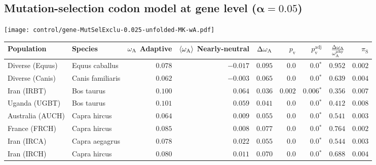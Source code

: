 \subsection{Mutation-selection codon model at gene level ($\bm{\alpha=0.05}$)}
\begin{center}
    \texttt{[image: control/gene-MutSelExclu-0.025-unfolded-MK-wA.pdf]}
    \begin{adjustbox}{width = 1\textwidth}
        \begin{tabular}{|l|l|r|r|r|r|r|r|r|}
            \toprule
            Population & Species & \specialcell{$\omega_{\mathrm{A}}$ \\ Adaptive}                & \specialcell{$\left< \omega_{\mathrm{A}} \right>$ \\ Nearly-neutral}                & $\Delta \omega_{\mathrm{A}} $    & $p_{\mathrm{v}}$ & $p_{\mathrm{v}}^{\mathrm{adj}}$  & $\frac{\Delta\omega_{\mathrm{A}}}{\omega_{\mathrm{A}}^{\mathrm{phy}}}$ & $\pi_{\textrm{S}}$    \\
            \midrule
            Diverse (Equus)                    & Equus caballus          & $ 0.078$ & $-0.017$  & $ 0.095$ & $0.0$ & $\bm{0.0{^*}}$ & $ 0.952$ & $ 0.002$ \\
            Diverse (Canis)                  & Canis familiaris          & $ 0.062$ & $-0.003$  & $ 0.065$ & $0.0$    & $\bm{0.0{^*}}$    & $ 0.639$ & $ 0.004$ \\
            Iran (IRBT)               & Bos taurus        & $ 0.100$ & $ 0.064$  & $ 0.036$ & $ 0.002$    & $\bm{ 0.006{^*}}$    & $ 0.356$ & $ 0.007$ \\
            Uganda (UGBT)                  & Bos taurus        & $ 0.101$ & $ 0.059$  & $ 0.041$ & $0.0$    & $\bm{0.0{^*}}$    & $ 0.412$ & $ 0.008$ \\
            Australia (AUCH)                    & Capra hircus      & $ 0.064$ & $ 0.009$  & $ 0.055$ & $0.0$    & $\bm{0.0{^*}}$    & $ 0.541$ & $ 0.003$ \\
            France (FRCH)                    & Capra hircus        & $ 0.085$ & $ 0.008$  & $ 0.077$ & $0.0$    & $\bm{0.0{^*}}$    & $ 0.764$ & $ 0.002$ \\
            Iran (IRCA)                   & Capra aegagrus        & $ 0.078$ & $ 0.022$  & $ 0.055$ & $0.0$    & $\bm{0.0{^*}}$    & $ 0.544$ & $ 0.003$ \\
            Iran (IRCH)                 & Capra hircus        & $ 0.080$ & $ 0.011$  & $ 0.070$ & $0.0$    & $\bm{0.0{^*}}$    & $ 0.688$ & $ 0.004$ \\

\end{tabular}
\end{adjustbox}
\end{center}
